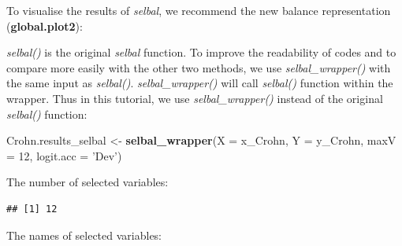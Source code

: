 \documentclass[openany]{book}
\newenvironment{Shaded}{\begin{snugshade}}{\end{snugshade}}
\newcommand{\KeywordTok}[1]{\textcolor[rgb]{0.13,0.29,0.53}{\textbf{#1}}}
\newcommand{\DataTypeTok}[1]{\textcolor[rgb]{0.13,0.29,0.53}{#1}}
\newcommand{\DecValTok}[1]{\textcolor[rgb]{0.00,0.00,0.81}{#1}}
\newcommand{\StringTok}[1]{\textcolor[rgb]{0.31,0.60,0.02}{#1}}
\newcommand{\CommentTok}[1]{\textcolor[rgb]{0.56,0.35,0.01}{\textit{#1}}}
\newcommand{\OperatorTok}[1]{\textcolor[rgb]{0.81,0.36,0.00}{\textbf{#1}}}
\newcommand{\NormalTok}[1]{#1}
\begin{document}
To visualise the results of \emph{selbal}, we recommend the new balance
representation (\textbf{global.plot2}):

\begin{Shaded}
\end{Shaded}

\emph{selbal()} is the original \emph{selbal} function. To improve the
readability of codes and to compare more easily with the other two
methods, we use \emph{selbal\_wrapper()} with the same input as
\emph{selbal()}. \emph{selbal\_wrapper()} will call \emph{selbal()}
function within the wrapper. Thus in this tutorial, we use
\emph{selbal\_wrapper()} instead of the original \emph{selbal()}
function:

\begin{Shaded}
\begin{Highlighting}[]
\NormalTok{Crohn.results_selbal <-}\StringTok{ }\KeywordTok{selbal_wrapper}\NormalTok{(}\DataTypeTok{X =}\NormalTok{ x_Crohn, }\DataTypeTok{Y =}\NormalTok{ y_Crohn, }
                                       \DataTypeTok{maxV =} \DecValTok{12}\NormalTok{, }\DataTypeTok{logit.acc =} \StringTok{'Dev'}\NormalTok{) }
\end{Highlighting}
\end{Shaded}

The number of selected variables:

\begin{Shaded}
\end{Shaded}

\begin{verbatim}
## [1] 12
\end{verbatim}

The names of selected variables:

\begin{Shaded}
\end{Shaded}
\end{document}
